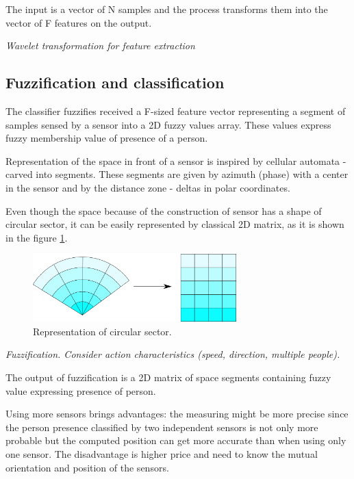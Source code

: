 The input is a vector of N samples and the process transforms them into the vector of
F features on the output.

{\it Wavelet transformation for feature extraction}

\subsection*{Fuzzification and classification}
The classifier fuzzifies received a F-sized feature vector representing a segment of samples sensed by a sensor
into a 2D fuzzy values array. These values express fuzzy membership value of presence of a person.

Representation of the space in front of a sensor is inspired by cellular automata - carved into
segments. These segments are given by azimuth (phase) with a center in the sensor and by
the distance zone - deltas in polar coordinates.

Even though the space because of the construction of sensor has a shape of circular sector,
it can be easily represented by classical 2D matrix, as it is shown in the figure \ref{fig:circularsector}.

\begin{figure}[h!]
\begin{center}
\includegraphics[width=0.7\textwidth]{obrazky-figures/circularsector_transformation.png}
\caption{Representation of circular sector.\label{fig:circularsector}}
\end{center}
\end{figure}

{\it Fuzzification. Consider action characteristics (speed, direction, multiple people).}

The output of fuzzification is a 2D matrix of space segments containing fuzzy value expressing
presence of person.

Using more sensors brings advantages: the measuring might be more precise since the person presence
classified by two independent sensors is not only more probable but the computed position
can get more accurate than when using only one sensor. The disadvantage is higher price and need
to know the mutual orientation and position of the sensors. 

